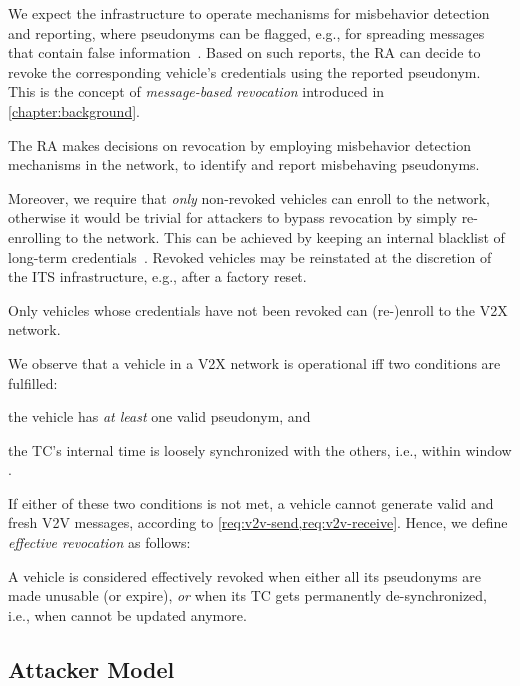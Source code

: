 We expect the infrastructure to operate mechanisms for misbehavior detection and
reporting, where pseudonyms can be flagged, e.g., for spreading messages that
contain false information~\cite{brecht2018scms,etsi2020tr103460}. Based on such
reports, the \ac{RA} can decide to revoke the corresponding vehicle's
credentials using the reported pseudonym. This is the concept of
\emph{message-based revocation} introduced in \cref{chapter:background}.
%
\begin{req}
    \label{req:revocation}
    The \ac{RA} makes decisions on revocation by employing misbehavior detection
    mechanisms in the network, to identify and report misbehaving pseudonyms.
\end{req}
Moreover, we require that \emph{only} non-revoked vehicles can enroll to the
network, otherwise it would be trivial for attackers to bypass revocation by
simply re-enrolling to the network. This can be achieved by keeping an internal
blacklist of long-term credentials~\cite{etsi2022102941,brecht2018scms}. Revoked
vehicles may be reinstated at the discretion of the \ac{ITS} infrastructure,
e.g., after a factory reset.
%
\begin{req}
  \label{req:revoked}
    Only vehicles whose credentials have not been revoked can (re-)enroll to the
    \ac{V2X} network.
\end{req}
%
We observe that a vehicle in a \ac{V2X} network is operational iff two
conditions are fulfilled:
%
\begin{paraenum}
    \item the vehicle has \emph{at least} one valid pseudonym, and
    \item the \ac{TC}'s internal time \funcnow{} is loosely synchronized with
    the others, i.e., within window \paramtt.
\end{paraenum}
%
If either of these two conditions is not met, a vehicle cannot generate valid
and fresh \ac{V2V} messages, according to \cref{req:v2v-send,req:v2v-receive}.
Hence, we define \emph{effective revocation} as follows:
%
\begin{defn}
A vehicle is considered effectively revoked when either all its pseudonyms are
made unusable (or expire), \emph{or} when its \ac{TC} gets permanently
de-synchronized, i.e., when \funcnow{} cannot be updated anymore.
\end{defn}



\subsection{Attacker Model}
\label{section:attacker-model}

